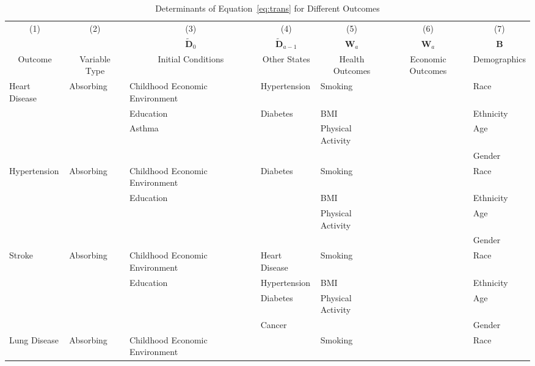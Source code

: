 \begin{table}
\caption{Determinants of Equation~\eqref{eq:trans} for Different Outcomes} \label{table:supertab1}
\begin{scriptsize}
\begin{tabular}{lllllll}
\toprule 
\multicolumn{1}{c}{(1)} & \multicolumn{1}{c}{(2)} & \multicolumn{1}{c}{(3)} & \multicolumn{1}{c}{(4)} & \multicolumn{1}{c}{(5)} & \multicolumn{1}{c}{(6)} & \multicolumn{1}{c}{(7)} \\
 & &  \multicolumn{1}{c}{$\tilde{\bm{D}}_0$} &  \multicolumn{1}{c}{$\tilde{\bm{D}}_{a-1}$} & \multicolumn{1}{c}{ $\bm{W}_a$ } &  \multicolumn{1}{c}{ $\bm{W}_a$ } &  \multicolumn{1}{c}{$\bm{B}$} \\ 
\multicolumn{1}{c}{Outcome} & \multicolumn{1}{c}{Variable Type} & \multicolumn{1}{c}{Initial Conditions} & \multicolumn{1}{c}{Other States} & \multicolumn{1}{c}{Health Outcomes} & \multicolumn{1}{c}{Economic Outcomes} & \multicolumn{1}{c}{Demographics} \\
\midrule
Heart Disease   & Absorbing & Childhood Economic Environment & Hypertension    & Smoking   &                                & Race \\
			    &           & Education & Diabetes & BMI &  & Ethnicity \\
			    &           & Asthma & & Physical Activity &  & Age \\
			    &           &        &  &  &  & Gender \\
\midrule			
Hypertension & Absorbing & Childhood Economic Environment & Diabetes    & Smoking   &                                & Race \\
&           & Education &  & BMI &  & Ethnicity \\
&           &  & & Physical Activity &  & Age \\
&           &        &  &  &  & Gender \\
\midrule			
Stroke & Absorbing & Childhood Economic Environment & Heart Disease    & Smoking   &                                & Race \\
&           & Education & Hypertension & BMI &  & Ethnicity \\
&           &  & Diabetes & Physical Activity &  & Age \\
&           &        & Cancer &  &  & Gender \\
\midrule		
Lung Disease & Absorbing & Childhood Economic Environment &   & Smoking   &                                & Race \\

\end{tabular}
\end{scriptsize}
\end{table}
